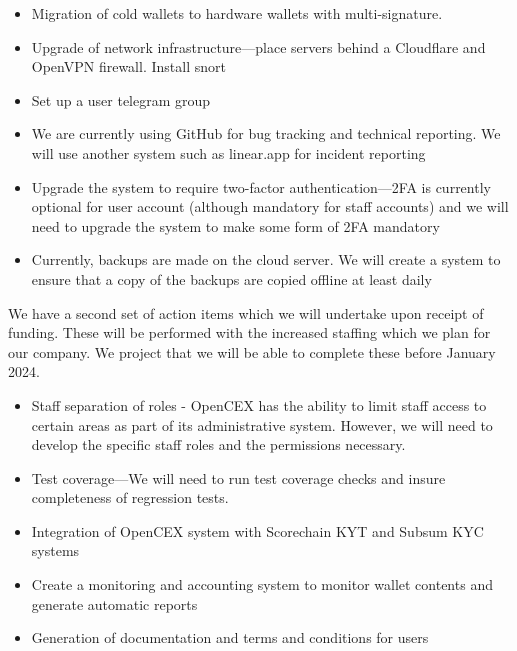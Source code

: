 \documentclass[]{report}
\begin{document}
\begin{itemize}
\item Migration of cold wallets to hardware wallets with
  multi-signature.

\item Upgrade of network infrastructure—place servers behind a Cloudflare and
OpenVPN firewall.  Install snort

\item Set up a user telegram group

\item We are currently using GitHub for bug tracking and technical
  reporting.  We will use another system such as linear.app for
  incident reporting

\item Upgrade the system to require two-factor authentication—2FA is
  currently optional for user account (although mandatory for staff
  accounts) and we will need to upgrade the system to make
  some form of 2FA mandatory

\item Currently, backups are made on the cloud server.  We will create
  a system to ensure that a copy of the backups are copied offline at
  least daily
\end{itemize}

We have a second set of action items which we will undertake upon
receipt of funding.  These will be performed with the
increased staffing which we plan for our company.  We project that we
will be able to complete these before January 2024.

\begin{itemize}

\item Staff separation of roles - OpenCEX has the ability to limit
  staff access to certain areas as part of its administrative system.
  However, we will need to develop the specific staff roles and the
  permissions necessary.

\item Test coverage—We will need to run test coverage checks and
  insure completeness of regression tests.

\item Integration of OpenCEX system with Scorechain KYT and Subsum KYC
  systems

\item Create a monitoring and accounting system to monitor wallet
  contents and generate automatic reports

\item Generation of documentation and terms and conditions for users

\end{itemize}
\end{document}
